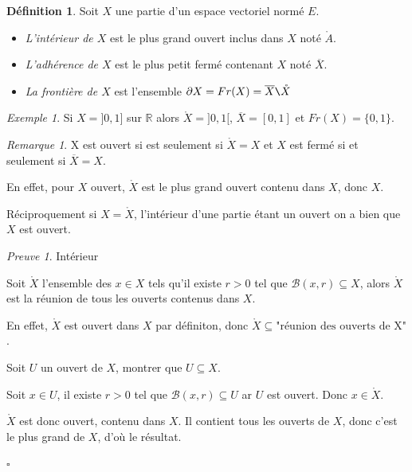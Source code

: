 \documentclass[]{article}
\theoremstyle{remark}
\newtheorem{myrem}{Remarque}
\newtheorem{myproof}{Preuve}
\newtheorem{myexmpl}{Exemple}
\theoremstyle{definition}
\newtheorem{mydef}{Définition}
\newcommand{\cqfd}{
	\hfill$\square$
}
\begin{document}
\begin{mydef}
	Soit $X$ une partie d'un espace vectoriel normé $E$.
	
	\begin{itemize}
	\item \textit{L'intérieur de $X$} est le plus grand ouvert inclus dans $X$ noté $\mathring{A}$.
	
	\item \textit{L'adhérence de $X$} est le plus petit fermé contenant $X$ noté $\overline{X}$.
	
	\item \textit{La frontière de $X$} est l'ensemble $\partial X=Fr(X)=\overline{X} \verb|\| \mathring{X}$
	\end{itemize}
\end{mydef}

\begin{myexmpl}
	Si $X = ]0, 1]$ sur $\mathbb{R}$ alors $\mathring{X} = ]0, 1[$, $\overline{X}=[0, 1]$ et $Fr(X)=\{0, 1\}$.
\end{myexmpl}

\begin{myrem}
	X est ouvert si est seulement si $\mathring{X} = X$ et $X$ est fermé si et seulement si $\overline{X}=X$.
	
	En effet, pour $X$ ouvert, $\mathring{X}$ est le plus grand ouvert contenu dans $X$, donc $X$.
	
	Réciproquement si $X=\mathring{X}$, l'intérieur d'une partie étant un ouvert on a bien que $X$ est ouvert.
\end{myrem}

\begin{myproof}Intérieur
	
	Soit $\mathring{X}$ l'ensemble des $x \in X$ tels qu'il existe $r > 0$ tel que $\mathcal{B}(x, r) \subseteq X$, alors $\mathring{X}$ est la réunion de tous les ouverts contenus dans $X$.
	
	En effet, $\mathring{X}$ est ouvert dans $X$ par définiton, donc $\mathring{X} \subseteq \text{"réunion des ouverts de X"}$.
	
	Soit $U$ un ouvert de $X$, montrer que $U \subseteq X$.
	
	Soit $x \in U$, il existe $r>0$ tel que $\mathcal{B}(x, r) \subseteq U$ ar $U$ est ouvert. Donc $x \in \mathring{X}$.
	
	$\mathring{X}$ est donc ouvert, contenu dans $X$. Il contient tous les ouverts de $X$, donc c'est le plus grand de $X$, d'où le résultat.
	\cqfd
\end{myproof}
\end{document}
